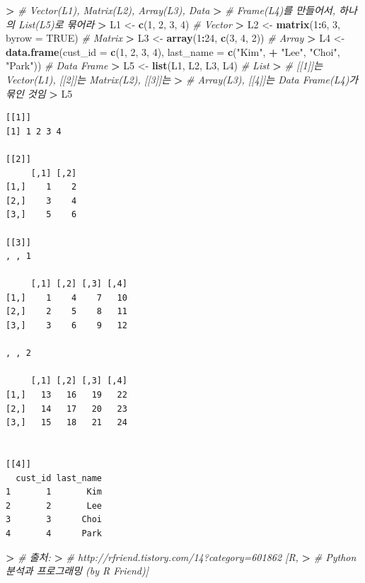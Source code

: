 \documentclass[12pt,a4paper]{book}
\newenvironment{Shaded}{\begin{snugshade}}{\end{snugshade}}
\newcommand{\KeywordTok}[1]{\textcolor[rgb]{0.13,0.29,0.53}{\textbf{#1}}}
\newcommand{\DataTypeTok}[1]{\textcolor[rgb]{0.13,0.29,0.53}{#1}}
\newcommand{\DecValTok}[1]{\textcolor[rgb]{0.00,0.00,0.81}{#1}}
\newcommand{\StringTok}[1]{\textcolor[rgb]{0.31,0.60,0.02}{#1}}
\newcommand{\CommentTok}[1]{\textcolor[rgb]{0.56,0.35,0.01}{\textit{#1}}}
\newcommand{\OtherTok}[1]{\textcolor[rgb]{0.56,0.35,0.01}{#1}}
\newcommand{\OperatorTok}[1]{\textcolor[rgb]{0.81,0.36,0.00}{\textbf{#1}}}
\newcommand{\ErrorTok}[1]{\textcolor[rgb]{0.64,0.00,0.00}{\textbf{#1}}}
\newcommand{\NormalTok}[1]{#1}
\theoremstyle{definition}
\theoremstyle{definition}
\theoremstyle{definition}
\theoremstyle{remark}
\begin{document}
\begin{Shaded}
\begin{Highlighting}[]
\OperatorTok{>}\StringTok{ }\CommentTok{# Vector(L1), Matrix(L2), Array(L3), Data}
\ErrorTok{>}\StringTok{ }\CommentTok{# Frame(L4)를 만들어서, 하나의 List(L5)로 묶어라}
\ErrorTok{>}\StringTok{ }\NormalTok{L1 <-}\StringTok{ }\KeywordTok{c}\NormalTok{(}\DecValTok{1}\NormalTok{, }\DecValTok{2}\NormalTok{, }\DecValTok{3}\NormalTok{, }\DecValTok{4}\NormalTok{)  }\CommentTok{# Vector}
\OperatorTok{>}\StringTok{ }\NormalTok{L2 <-}\StringTok{ }\KeywordTok{matrix}\NormalTok{(}\DecValTok{1}\OperatorTok{:}\DecValTok{6}\NormalTok{, }\DecValTok{3}\NormalTok{, }\DataTypeTok{byrow =} \OtherTok{TRUE}\NormalTok{)  }\CommentTok{# Matrix}
\OperatorTok{>}\StringTok{ }\NormalTok{L3 <-}\StringTok{ }\KeywordTok{array}\NormalTok{(}\DecValTok{1}\OperatorTok{:}\DecValTok{24}\NormalTok{, }\KeywordTok{c}\NormalTok{(}\DecValTok{3}\NormalTok{, }\DecValTok{4}\NormalTok{, }\DecValTok{2}\NormalTok{))  }\CommentTok{# Array}
\OperatorTok{>}\StringTok{ }\NormalTok{L4 <-}\StringTok{ }\KeywordTok{data.frame}\NormalTok{(}\DataTypeTok{cust_id =} \KeywordTok{c}\NormalTok{(}\DecValTok{1}\NormalTok{, }\DecValTok{2}\NormalTok{, }\DecValTok{3}\NormalTok{, }\DecValTok{4}\NormalTok{), }\DataTypeTok{last_name =} \KeywordTok{c}\NormalTok{(}\StringTok{"Kim"}\NormalTok{, }
\OperatorTok{+}\StringTok{     "Lee"}\NormalTok{, }\StringTok{"Choi"}\NormalTok{, }\StringTok{"Park"}\NormalTok{))  }\CommentTok{# Data Frame}
\OperatorTok{>}\StringTok{ }\NormalTok{L5 <-}\StringTok{ }\KeywordTok{list}\NormalTok{(L1, L2, L3, L4)  }\CommentTok{# List}
\OperatorTok{>}\StringTok{ }\CommentTok{# [[1]]는 Vector(L1), [[2]]는 Matrix(L2), [[3]]는}
\ErrorTok{>}\StringTok{ }\CommentTok{# Array(L3), [[4]]는 Data Frame(L4)가 묶인 것임}
\ErrorTok{>}\StringTok{ }\NormalTok{L5}
\end{Highlighting}
\end{Shaded}

\begin{verbatim}
[[1]]
[1] 1 2 3 4

[[2]]
     [,1] [,2]
[1,]    1    2
[2,]    3    4
[3,]    5    6

[[3]]
, , 1

     [,1] [,2] [,3] [,4]
[1,]    1    4    7   10
[2,]    2    5    8   11
[3,]    3    6    9   12

, , 2

     [,1] [,2] [,3] [,4]
[1,]   13   16   19   22
[2,]   14   17   20   23
[3,]   15   18   21   24


[[4]]
  cust_id last_name
1       1       Kim
2       2       Lee
3       3      Choi
4       4      Park
\end{verbatim}

\begin{Shaded}
\begin{Highlighting}[]
\OperatorTok{>}\StringTok{ }\CommentTok{# 출처:}
\ErrorTok{>}\StringTok{ }\CommentTok{# http://rfriend.tistory.com/14?category=601862 [R,}
\ErrorTok{>}\StringTok{ }\CommentTok{# Python 분석과 프로그래밍 (by R Friend)]}
\end{Highlighting}
\end{Shaded}

\renewcommand\bibname{References}

\end{document}
